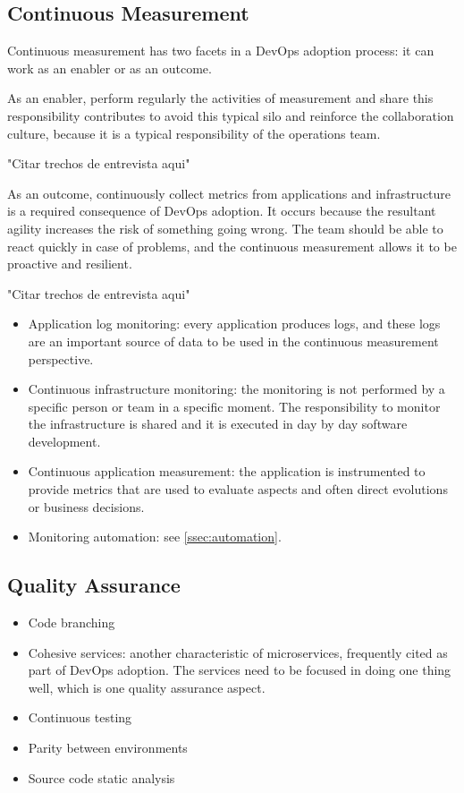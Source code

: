 \subsection{Continuous Measurement}
Continuous measurement has two facets in a DevOps adoption process: it can work
as an enabler or as an outcome.

As an enabler, perform regularly the activities of measurement and share this
responsibility contributes to avoid this typical silo and reinforce the
collaboration culture, because it is a typical responsibility of the operations
team.

"Citar trechos de entrevista aqui"

As an outcome, continuously collect metrics from applications and
infrastructure is a required consequence of DevOps adoption. It occurs because
the resultant agility increases the risk of something going wrong. The team
should be able to react quickly in case of problems, and the continuous
measurement allows it to be proactive and resilient.

"Citar trechos de entrevista aqui"

\begin{itemize}
\item Application log monitoring: every application produces logs, and these
logs are an important source of data to be used in the continuous measurement
perspective.

\item Continuous infrastructure monitoring: the monitoring is not performed
by a specific person or team in a specific moment. The responsibility to
monitor the infrastructure is shared and it is executed in day by day
software development.

\item Continuous application measurement: the application is instrumented to
provide metrics that are used to evaluate aspects and often direct evolutions
or business decisions.

\item Monitoring automation: see \ref{ssec:automation}.
\end{itemize}

\subsection{Quality Assurance}
\begin{itemize}
\item Code branching

\item Cohesive services: another characteristic of microservices, frequently
cited as part of DevOps adoption. The services need to be focused in doing one
thing well, which is one quality assurance aspect.

\item Continuous testing
\item Parity between environments
\item Source code static analysis
\end{itemize}

